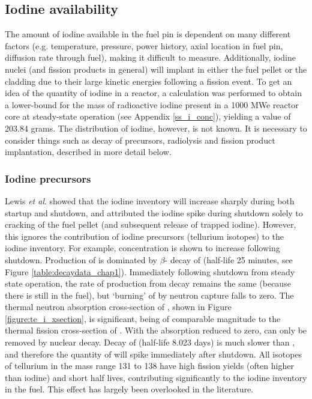 \subsection{Iodine availability}

The amount of iodine available in the fuel pin is dependent on many different factors (e.g. temperature, pressure, power history, axial location in fuel pin, diffusion rate through fuel), making it difficult to measure. Additionally, iodine nuclei (and fission products in general) will implant in either the fuel pellet or the cladding due to their large kinetic energies following a fission event. To get an idea of the quantity of iodine in a reactor, a calculation was performed to obtain a lower-bound for the mass of radioactive iodine present in a 1000 MWe reactor core at steady-state operation (see Appendix \ref{ss_i_conc}), yielding a value of 203.84 grams. The distribution of iodine, however, is not known. It is necessary to consider things such as decay of precursors, radiolysis and fission product implantation, described in more detail below.

\subsubsection{Iodine precursors}

Lewis \emph{et al}. \cite{Lewis2017} showed that the iodine inventory will increase sharply during both startup and shutdown, and attributed the iodine spike during shutdown solely to cracking of the fuel pellet (and subsequent release of trapped iodine). However, this ignores the contribution of iodine precursors (tellurium isotopes) to the iodine inventory. For example,  concentration is shown to increase following shutdown. Production of  is dominated by $\beta$- decay of  (half-life 25 minutes, see Figure \ref{table:decaydata_chap1}). Immediately following shutdown from steady state operation, the rate of  production from  decay remains the same (because there is still  in the fuel), but `burning' of  by neutron capture falls to zero. The thermal neutron absorption cross-section of , shown in Figure \ref{figure:te_i_xsection}, is significant, being of comparable magnitude to the thermal fission cross-section of . With the absorption reduced to zero,  can only be removed by nuclear decay. Decay of  (half-life 8.023 days) is much slower than , and therefore the quantity of  will spike immediately after shutdown. All isotopes of tellurium in the mass range 131 to 138 have high fission yields (often higher than iodine) and short half lives, contributing significantly to the iodine inventory in the fuel. This effect has largely been overlooked in the literature.

